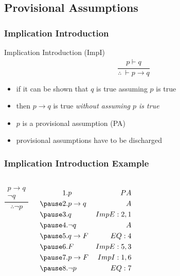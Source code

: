 \documentclass[dvipsnames]{beamer}
\begin{document}
\subsection{Provisional Assumptions}

\begin{frame}
  \frametitle{Implication Introduction}

  \begin{block}{Implication Introduction (ImpI)}
    \[
    \frac
      {
        \begin{array}{c}
          p \vdash q
        \end{array}
      }
      {
        \therefore ~ \vdash p \rightarrow q
      }
    \]
  \end{block}

  \begin{itemize}
    \item if it can be shown that $q$ is true assuming $p$ is true
    \item then $p \rightarrow q$ is true \emph{without assuming $p$ is true}

    \pause
    \medskip
    \item $p$ is a \alert{provisional assumption} (PA)
    \item provisional assumptions have to be \alert{discharged}
  \end{itemize}
\end{frame}

\begin{frame}
  \frametitle{Implication Introduction Example}

  \begin{columns}
    \[
    \frac
      {
        \begin{array}{c}
          p \rightarrow q\\
          \neg q
        \end{array}
      }
      {
        \therefore \neg p
      }
    \]

    \pause
    \begin{eqnarray*}
      1. & p                         & PA\\
      \pause
      2. & p \rightarrow q           & A\\
      \pause
      3. & q                         & ImpE:2,1\\
      \pause
      4. & \neg q                    & A\\
      \pause
      5. & q \rightarrow F           & EQ:4\\
      \pause
      6. & F                         & ImpE:5,3\\
      \pause
      7. & p \rightarrow F           & ImpI:1,6\\
      \pause
      8. & \neg p                    & EQ:7\\
    \end{eqnarray*}
  \end{columns}
\end{frame}
\end{document}
